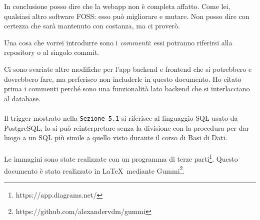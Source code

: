 In conclusione posso dire che la webapp non è completa affatto. Come lei, qualsiasi altro software FOSS: esso può migliorare e mutare. Non posso dire con certezza che sarà mantenuto con costanza, ma ci proverò.


Una cosa che vorrei introdurre sono i \textit{commenti}: essi potranno riferirsi alla repository o al singolo commit.

Ci sono svariate altre modifiche per l'app backend e frontend che si potrebbero e dovrebbero fare, ma preferisco non includerle in questo documento. Ho citato prima i commenti perché sono una funzionalità lato backend che si interlacciano al database.\\\\
Il trigger mostrato nella \verb|Sezione 5.1| si riferisce al linguaggio SQL usato da PostgreSQL, lo si può reinterpretare senza la divisione con la procedura per dar luogo a un SQL più simile a quello visto durante il corso di Basi di Dati.\\\\
Le immagini sono state realizzate con un programma di terze parti\footnote{https://app.diagrams.net/}. Questo documento è stato realizzato in \LaTeX\ mediante Gummi\footnote{https://github.com/alexandervdm/gummi}.
